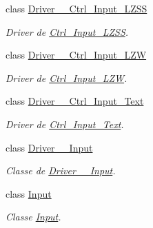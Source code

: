 \begin{DoxyCompactItemize}
class \hyperlink{classpersistencia_1_1input_1_1Driver____Ctrl__Input__LZSS}{Driver\+\_\+\+\_\+\+Ctrl\+\_\+\+Input\+\_\+\+L\+Z\+SS}
\begin{DoxyCompactList}\small\item\em Driver de \hyperlink{classpersistencia_1_1input_1_1Ctrl__Input__LZSS}{Ctrl\+\_\+\+Input\+\_\+\+L\+Z\+SS}. \end{DoxyCompactList}\item 
class \hyperlink{classpersistencia_1_1input_1_1Driver____Ctrl__Input__LZW}{Driver\+\_\+\+\_\+\+Ctrl\+\_\+\+Input\+\_\+\+L\+ZW}
\begin{DoxyCompactList}\small\item\em Driver de \hyperlink{classpersistencia_1_1input_1_1Ctrl__Input__LZW}{Ctrl\+\_\+\+Input\+\_\+\+L\+ZW}. \end{DoxyCompactList}\item 
class \hyperlink{classpersistencia_1_1input_1_1Driver____Ctrl__Input__Text}{Driver\+\_\+\+\_\+\+Ctrl\+\_\+\+Input\+\_\+\+Text}
\begin{DoxyCompactList}\small\item\em Driver de \hyperlink{classpersistencia_1_1input_1_1Ctrl__Input__Text}{Ctrl\+\_\+\+Input\+\_\+\+Text}. \end{DoxyCompactList}\item 
class \hyperlink{classpersistencia_1_1input_1_1Driver____Input}{Driver\+\_\+\+\_\+\+Input}
\begin{DoxyCompactList}\small\item\em Classe de \hyperlink{classpersistencia_1_1input_1_1Driver____Input}{Driver\+\_\+\+\_\+\+Input}. \end{DoxyCompactList}\item 
class \hyperlink{classpersistencia_1_1input_1_1Input}{Input}
\begin{DoxyCompactList}\small\item\em Classe \hyperlink{classpersistencia_1_1input_1_1Input}{Input}. \end{DoxyCompactList}\end{DoxyCompactItemize}
